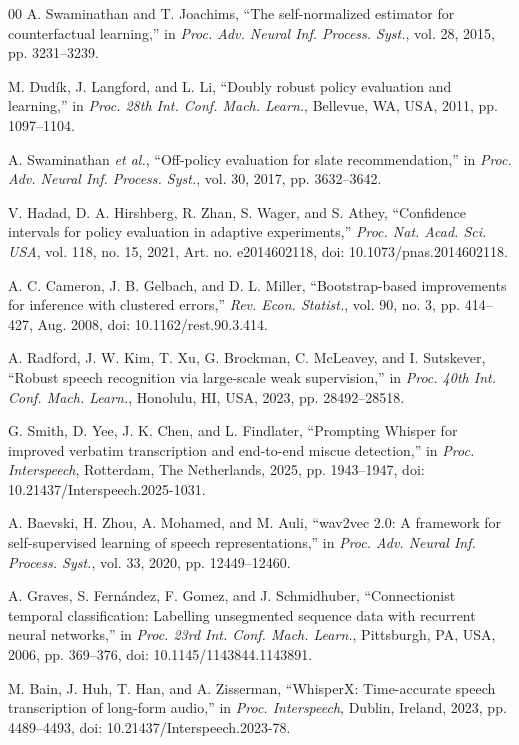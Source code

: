 \documentclass{ieeeaccess}
\begin{document}
\begin{thebibliography}{00}
 A. Swaminathan and T. Joachims, ``The self-normalized estimator for counterfactual learning,'' in \emph{Proc. Adv. Neural Inf. Process. Syst.}, vol. 28, 2015, pp. 3231--3239.

 M. Dud\'{i}k, J. Langford, and L. Li, ``Doubly robust policy evaluation and learning,'' in \emph{Proc. 28th Int. Conf. Mach. Learn.}, Bellevue, WA, USA, 2011, pp. 1097--1104.

 A. Swaminathan \emph{et al.}, ``Off-policy evaluation for slate recommendation,'' in \emph{Proc. Adv. Neural Inf. Process. Syst.}, vol. 30, 2017, pp. 3632--3642.

 V. Hadad, D. A. Hirshberg, R. Zhan, S. Wager, and S. Athey, ``Confidence intervals for policy evaluation in adaptive experiments,'' \emph{Proc. Nat. Acad. Sci. USA}, vol. 118, no. 15, 2021, Art. no. e2014602118, doi: 10.1073/pnas.2014602118.

 A. C. Cameron, J. B. Gelbach, and D. L. Miller, ``Bootstrap-based improvements for inference with clustered errors,'' \emph{Rev. Econ. Statist.}, vol. 90, no. 3, pp. 414--427, Aug. 2008, doi: 10.1162/rest.90.3.414.

 A. Radford, J. W. Kim, T. Xu, G. Brockman, C. McLeavey, and I. Sutskever, ``Robust speech recognition via large-scale weak supervision,'' in \emph{Proc. 40th Int. Conf. Mach. Learn.}, Honolulu, HI, USA, 2023, pp. 28492--28518.

 G. Smith, D. Yee, J. K. Chen, and L. Findlater, ``Prompting Whisper for improved verbatim transcription and end-to-end miscue detection,'' in \emph{Proc. Interspeech}, Rotterdam, The Netherlands, 2025, pp. 1943--1947, doi: 10.21437/Interspeech.2025-1031.

 A. Baevski, H. Zhou, A. Mohamed, and M. Auli, ``wav2vec 2.0: A framework for self-supervised learning of speech representations,'' in \emph{Proc. Adv. Neural Inf. Process. Syst.}, vol. 33, 2020, pp. 12449--12460.

 A. Graves, S. Fern\'{a}ndez, F. Gomez, and J. Schmidhuber, ``Connectionist temporal classification: Labelling unsegmented sequence data with recurrent neural networks,'' in \emph{Proc. 23rd Int. Conf. Mach. Learn.}, Pittsburgh, PA, USA, 2006, pp. 369--376, doi: 10.1145/1143844.1143891.

 M. Bain, J. Huh, T. Han, and A. Zisserman, ``WhisperX: Time-accurate speech transcription of long-form audio,'' in \emph{Proc. Interspeech}, Dublin, Ireland, 2023, pp. 4489--4493, doi: 10.21437/Interspeech.2023-78.


\end{thebibliography}
\end{document}
